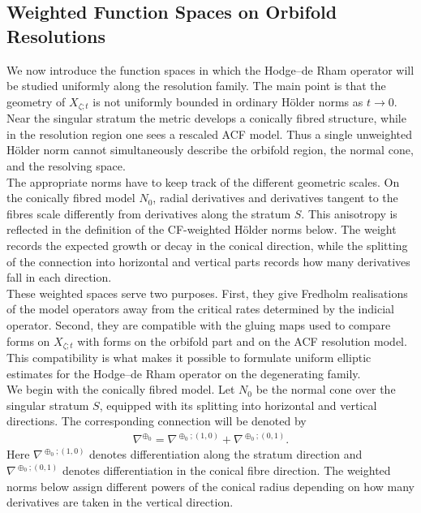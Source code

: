 \documentclass[psamsfonts]{amsart}
\theoremstyle{plain}
\theoremstyle{definition}{
\newtheorem{defi}{Definition}[section]
\newtheorem{ass}{Assumption}
\newtheorem*{nota}{Notation}}
\theoremstyle{remark}{
\newtheorem{rem}{Remark}
\newtheorem{ex}{Example}}
\theoremstyle{plain}{
\newtheorem{thm}{Theorem}[section]
\newtheorem{lem}{Lemma}[section]
\newtheorem{cor}{Corollary}[section]
\newtheorem{prop}{Proposition}[section]
\newtheorem{con}{Conjecture}[section]}
\begin{document}
\subsection{Weighted Function Spaces on Orbifold Resolutions}
\label{Weighted Function Spaces on Orbifold Resolutions}

We now introduce the function spaces in which the Hodge--de Rham operator will be studied uniformly along the resolution family. The main point is that the geometry of $X_{\zeta;t}$ is not uniformly bounded in ordinary Hölder norms as $t\to0$. Near the singular stratum the metric develops a conically fibred structure, while in the resolution region one sees a rescaled ACF model. Thus a single unweighted Hölder norm cannot simultaneously describe the orbifold region, the normal cone, and the resolving space.\\

The appropriate norms have to keep track of the different geometric scales. On the conically fibred model $N_0$, radial derivatives and derivatives tangent to the fibres scale differently from derivatives along the stratum $S$. This anisotropy is reflected in the definition of the CF-weighted Hölder norms below. The weight records the expected growth or decay in the conical direction, while the splitting of the connection into horizontal and vertical parts records how many derivatives fall in each direction.\\

These weighted spaces serve two purposes. First, they give Fredholm realisations of the model operators away from the critical rates determined by the indicial operator. Second, they are compatible with the gluing maps used to compare forms on $X_{\zeta;t}$ with forms on the orbifold part and on the ACF resolution model. This compatibility is what makes it possible to formulate uniform elliptic estimates for the Hodge--de Rham operator on the degenerating family.\\

We begin with the conically fibred model. Let $N_0$ be the normal cone over the singular stratum $S$, equipped with its splitting into horizontal and vertical directions. The corresponding connection will be denoted by
\begin{align*}
    \nabla^{\oplus_0}=\nabla^{\oplus_0;(1,0)}+\nabla^{\oplus_0;(0,1)} .
\end{align*}
Here $\nabla^{\oplus_0;(1,0)}$ denotes differentiation along the stratum direction and $\nabla^{\oplus_0;(0,1)}$ denotes differentiation in the conical fibre direction. The weighted norms below assign
different powers of the conical radius depending on how many derivatives are taken in the vertical direction.
\end{document}
